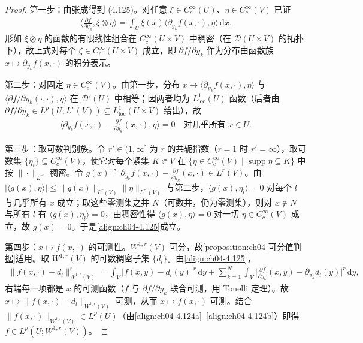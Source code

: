 \documentclass[../../main.tex]{subfiles}%
\begin{document}
\begin{proof}
第一步：由张成得到 (4.125)。对任意 $\xi\in C_c^\infty(U)$、$\eta\in C_c^\infty(V)$ 已证
\begin{align*}
\Big\langle\frac{\partial f}{\partial y_k},\xi\otimes\eta\Big\rangle=\int_U\xi(x)\langle\partial_{y_k}f(x,\cdot),\eta\rangle\,\mathrm{d}x .
\end{align*}
形如 $\xi\otimes\eta$ 的函数的有限线性组合在 $C_c^\infty(U\times V)$ 中稠密（在 $\mathcal{D}(U\times V)$ 的拓扑下），故上式对每个 $\zeta\in C_c^\infty(U\times V)$ 成立，即 $\partial f/\partial y_k$ 作为分布由函数族 $x\mapsto\partial_{y_k}f(x,\cdot)$ 的积分表示。

第二步：对固定 $\eta\in C_c^\infty(V)$。由第一步，分布 $x\mapsto\langle\partial_{y_k}f(x,\cdot),\eta\rangle$ 与 $\langle\partial f/\partial y_k(\cdot,\cdot),\eta\rangle$ 在 $\mathcal{D}'(U)$ 中相等；因两者均为 $L^1_{\mathrm{loc}}(U)$ 函数（后者由 $\partial f/\partial y_k\in L^p(U;L^r(V))\subseteq L^1_{\mathrm{loc}}(U\times V)$ 给出），故
\begin{align*}
\langle\partial_{y_k}f(x,\cdot)-\tfrac{\partial f}{\partial y_k}(x,\cdot),\eta\rangle=0\quad\text{对几乎所有 }x\in U .
\end{align*}

第三步：取可数判别族。令 $r'\in(1,\infty]$ 为 $r$ 的共轭指数（$r=1$ 时 $r'=\infty$），取可数集 $\{\eta_l\}\subseteq C_c^\infty(V)$，使它对每个紧集 $K\Subset V$ 在 $\{\eta\in C_c^\infty(V)\mid\operatorname{supp}\eta\subseteq K\}$ 中按 $\|\cdot\|_{L^{r'}}$ 稠密。令 $g(x)\triangleq\partial_{y_k}f(x,\cdot)-\frac{\partial f}{\partial y_k}(x,\cdot)\in L^r(V)$。由 $|\langle g(x),\eta\rangle|\leqslant\|g(x)\|_{L^r(V)}\|\eta\|_{L^{r'}(V)}$ 与第二步，$\langle g(x),\eta_l\rangle=0$ 对每个 $l$ 与几乎所有 $x$ 成立；取这些零测集之并 $N$（可数并，仍为零测集），则对 $x\notin N$ 与所有 $l$ 有 $\langle g(x),\eta_l\rangle=0$，由稠密性得 $\langle g(x),\eta\rangle=0$ 对一切 $\eta\in C_c^\infty(V)$ 成立，故 $g(x)=0$。于是\eqref{align:ch04-4.125}成立。

第四步：$x\mapsto f(x,\cdot)$ 的可测性。$W^{1,r}(V)$ 可分，故\cref{proposition:ch04-可分值判据}适用。取 $W^{1,r}(V)$ 的可数稠密子集 $\{d_l\}$。由\eqref{align:ch04-4.125}，
\begin{align*}
\|f(x,\cdot)-d_l\|_{W^{1,r}(V)}^r=\int_V|f(x,y)-d_l(y)|^r\,\mathrm{d}y+\sum_{k=1}^N\int_V\Big|\frac{\partial f}{\partial y_k}(x,y)-\partial_{y_k}d_l(y)\Big|^r\,\mathrm{d}y,
\end{align*}
右端每一项都是 $x$ 的可测函数（$f$ 与 $\partial f/\partial y_k$ 联合可测，用 Tonelli 定理）。故 $x\mapsto\|f(x,\cdot)-d_l\|_{W^{1,r}(V)}$ 可测，从而 $x\mapsto f(x,\cdot)$ 可测。结合 $\|f(x,\cdot)\|_{W^{1,r}(V)}\in L^p(U)$（由\eqref{align:ch04-4.124a}--\eqref{align:ch04-4.124b}）即得 $f\in L^p(U;W^{1,r}(V))$。
\end{proof}
\end{document}
